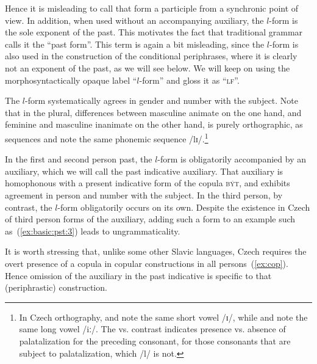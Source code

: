 \documentclass[output=paper]{langsci/langscibook}
\begin{document}
\noindent Hence it is misleading to call that form a participle from a synchronic point of view. In addition, when used without an accompanying auxiliary, the $l$-form is the sole exponent of the past. This motivates the fact that traditional grammar calls it the ``past form''. This term is again a bit misleading, since the $l$-form is also used in the construction of the conditional periphrases, where it is clearly not an exponent of the past, as we will see below. We will keep on using the morphosyntactically opaque label “$l$-form” and  gloss it as “\textsc{lf}”.

The $l$-form systematically agrees in gender and number with the subject. Note that in the plural, differences between  masculine animate on the one hand, and feminine and masculine inanimate on the other hand, is purely orthographic, as sequences  and  note the same phonemic sequence /lɪ/.\footnote{In Czech orthography,  and  note the same short vowel /ɪ/, while  and  note the same long vowel /iː/. The  vs.  contrast indicates presence vs. absence of palatalization for the preceding consonant, for those consonants that are subject to palatalization, which /l/ is not.}


In the first and second person past, the $l$-form is obligatorily accompanied by an auxiliary, which we will call the past indicative auxiliary. That auxiliary is homophonous with a present indicative form of the copula \textsc{být}, and exhibits agreement in person and number with the subject. In the third person, by contrast, the $l$-form obligatorily occurs on its own. Despite the existence in Czech of third person forms of the auxiliary, adding such a form to an example such as~(\ref{ex:basic:pst:3}) leads to ungrammaticality. 

\begin{exe}
\end{exe}

It is worth stressing that, unlike some other Slavic languages, Czech requires the overt presence of a copula in copular constructions in all persons~(\ref{ex:cop}). Hence omission of the auxiliary in the past indicative is specific to that (periphrastic) construction.

\begin{exe}
\ex\label{ex:cop}\begin{xlist}
\end{xlist}
\end{exe}
\end{document}
